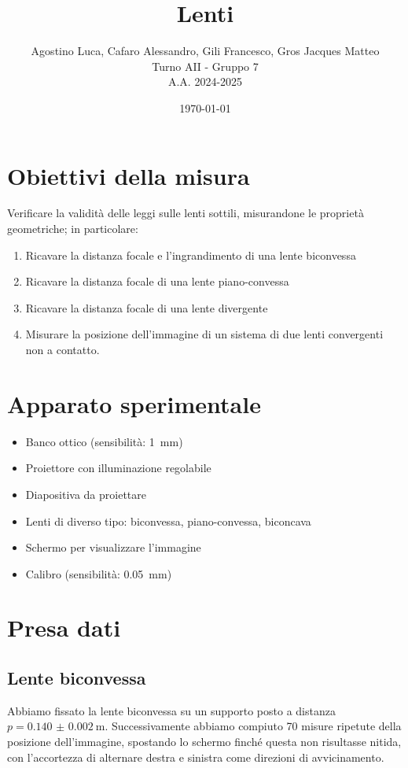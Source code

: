 \documentclass[a4paper]{article}
\title{\textbf{Lenti}}
\author{Agostino Luca, Cafaro Alessandro, Gili Francesco, Gros Jacques Matteo\\ Turno AII - Gruppo 7\\A.A. 2024-2025}
\date{\today}
\begin{document}
    
\maketitle

\tableofcontents
\newpage

\section{Obiettivi della misura}
    Verificare la validità delle leggi sulle lenti sottili, misurandone le proprietà geometriche; in particolare:
    \begin{enumerate}
        \item Ricavare la distanza focale e l'ingrandimento di una lente biconvessa
        \item Ricavare la distanza focale di una lente piano-convessa
        \item Ricavare la distanza focale di una lente divergente
        \item Misurare la posizione dell'immagine di un sistema di due lenti convergenti non a contatto.
    \end{enumerate}
\section{Apparato sperimentale}
    \begin{itemize}
        \item Banco ottico (sensibilità: \SI{1}{\mm})
        \item Proiettore con illuminazione regolabile
        \item Diapositiva da proiettare
        \item Lenti di diverso tipo: biconvessa, piano-convessa, biconcava
        \item Schermo per visualizzare l'immagine
        \item Calibro (sensibilità: \SI{0.05}{\mm})
    \end{itemize}
\section{Presa dati}
    \subsection{Lente biconvessa}\label{sec:biconvessa}
        Abbiamo fissato la lente biconvessa su un supporto posto a distanza $p=\SI{0.140(2)}{\m}$. Successivamente abbiamo compiuto 70 misure ripetute della posizione dell'immagine, spostando lo schermo finché questa non risultasse nitida, con l'accortezza di alternare destra e sinistra come direzioni di avvicinamento.
\end{document}
